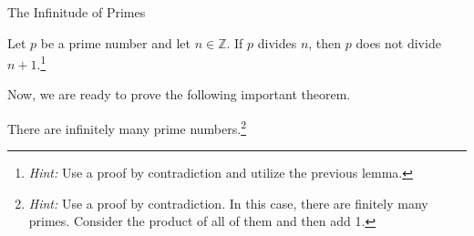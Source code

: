 \begin{section}{The Infinitude of Primes}
\begin{lemma}\label{lem:plus1}
Let $p$ be a prime number  and let $n\in \mathbb{Z}$. If $p$ divides $n$, then $p$ does not divide $n+1$.\footnote{\emph{Hint:} Use a proof by contradiction and utilize the previous lemma.}
\end{lemma}

Now, we are ready to prove the following important theorem.

\begin{theorem}\label{thm:infprimes}
There are infinitely many prime numbers.\footnote{\emph{Hint:} Use a proof by contradiction.  In this case, there are finitely many primes.  Consider the product of all of them and then add 1.}
\end{theorem}

\end{section}